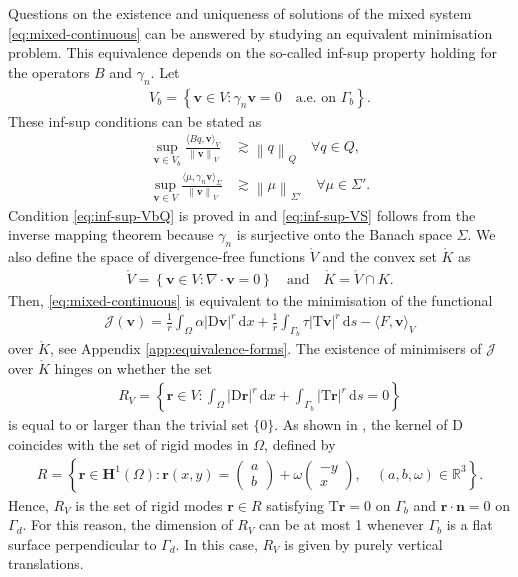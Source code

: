 \documentclass[onefignum,onetabnum]{siamart190516}
\newcommand{\RR}{\mathbb{R}}
\newcommand{\bn}{\boldsymbol{n}}
\newcommand{\br}{\boldsymbol{r}}
\newcommand{\bv}{\boldsymbol{v}}
\newcommand{\bH}{\boldsymbol{H}}
\newcommand{\bT}{\boldsymbol{\mathrm{T}}}
\newcommand{\bD}{\boldsymbol{\mathrm{D}}}
\newcommand{\dd}{\mathrm{d}}
\newcommand{\nrm}[1]{\left\lVert#1\right\rVert}
\newcommand{\Vo}{\mathring{V}}
\newcommand{\Ko}{\mathring{K}}
\newcommand{\Jc}{\mathcal{J}}
\begin{document}
Questions on the existence and uniqueness of solutions of the mixed system \eqref{eq:mixed-continuous} can be answered by studying an equivalent minimisation problem. This equivalence depends on the so-called inf-sup property holding for the operators $B$ and $\gamma_n$. Let 
%
\begin{align}
	V_b = \left\lbrace \bv\in V : \gamma_n \bv = 0 \quad \text{a.e.~on $\Gamma_b$}  \right\rbrace.
\end{align}
%
These inf-sup conditions can be stated as
%
\begin{align}
	\sup_{\bv\in V_b} \frac{\langle Bq, \bv \rangle_V}{\nrm{\bv}_V} &\gtrsim \nrm{q}_Q \quad \forall q\in Q, \label{eq:inf-sup-VbQ} \\
	\sup_{\bv\in V} \frac{\langle \mu, \gamma_n\bv\rangle_\Sigma}{\nrm{\bv}_V} &\gtrsim \nrm{\mu}_{\Sigma'} \quad  \forall \mu\in \Sigma'. \label{eq:inf-sup-VS}
\end{align}
%
Condition \eqref{eq:inf-sup-VbQ} is proved in \cite[Lemma 3.2.7]{jouvet2010} and \eqref{eq:inf-sup-VS} follows from the inverse mapping theorem because $\gamma_n$ is surjective onto the Banach space $\Sigma$. We also define the space of divergence-free functions $\Vo$ and the convex set $\Ko$ as
%
\begin{align*}
	\Vo = \left\lbrace \bv\in V : \nabla \cdot \bv = 0 \right\rbrace \quad \text{and} \quad \Ko = \Vo \cap K.
\end{align*}
%
Then, \eqref{eq:mixed-continuous} is equivalent to the minimisation of the functional
%
\begin{align}\label{eq:Jc-functional}
	\Jc(\bv) = \frac{1}{r}\int_\Omega \alpha | \bD\bv |^r\,\dd x + \frac{1}{r}\int_{\Gamma_b} \tau | \bT\bv |^r\,\dd s - \langle F, \bv \rangle_V
\end{align}
%
over $\Ko$, see Appendix \ref{app:equivalence-forms}. The existence of minimisers of $\Jc$ over $\Ko$ hinges on whether the set
%
\begin{align*}
	R_V = \left\lbrace \br\in V : \int_\Omega | \bD\br |^r\,\dd x + \int_{\Gamma_b} | \bT\br |^r\,\dd s = 0 \right\rbrace
\end{align*}
%
is equal to or larger than the trivial set $\{0\}$. As shown in \cite[Lemma 6.1]{kikuchi1988}, the kernel of $\bD$ coincides with the set of rigid modes in $\Omega$, defined by
%
\begin{align*}
	R = \left\lbrace \br\in\bH^1(\Omega):\br(x,y) = \left(\begin{array}{c}
	a \\
	b
\end{array}	\right) + \omega \left(\begin{array}{r}
	-y \\
	x
\end{array}	\right), \quad (a,b,\omega)\in\RR^3\right\rbrace.
\end{align*}
%
Hence, $R_V$ is the set of rigid modes $\br\in R$ satisfying $\bT\br = 0$ on $\Gamma_b$ and $\br\cdot\bn = 0$ on $\Gamma_d$. For this reason, the dimension of $R_V$ can be at most 1 whenever $\Gamma_b$ is a flat surface perpendicular to $\Gamma_d$. In this case, $R_V$ is given by purely vertical translations. 
\end{document}
